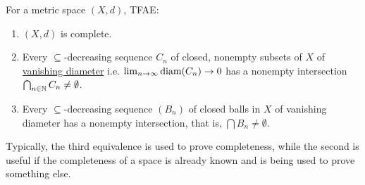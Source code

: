 \documentclass[14pt,oneside]{extarticle}
\begin{document}
\begin{proposition*}
  For a metric space $(X,d)$, TFAE:
  \begin{enumerate}[nosep]
    \item $(X,d)$ is complete.
    \item Every $\subseteq$-decreasing sequence $C_n$ of closed, nonempty subsets of $X$ of \\ \underline{vanishing diameter} i.e. $\lim_{n \to \infty} \text{diam}{(C_n)} \to 0$ has a nonempty intersection $\bigcap_{n \in \mathbb{N}} C_n \neq \emptyset$.
    \item Every $\subseteq$-decreasing sequence $(B_n)$ of closed balls in $X$ of vanishing diameter has a nonempty intersection, that is, $\bigcap B_n \neq \emptyset$.
  \end{enumerate}
\end{proposition*}
Typically, the third equivalence is used to prove completeness, while the second is useful if the completeness of a space is already known and is being used to prove something else.
\end{document}
